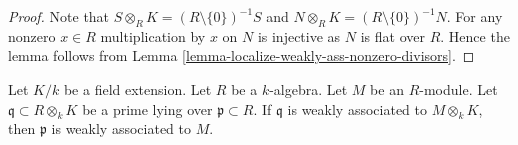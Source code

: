 \begin{proof}
Note that $S \otimes_R K = (R \setminus \{0\})^{-1}S$ and
$N \otimes_R K = (R \setminus \{0\})^{-1}N$.
For any nonzero $x \in R$ multiplication by $x$ on $N$ is injective as
$N$ is flat over $R$. Hence the lemma follows from
Lemma \ref{lemma-localize-weakly-ass-nonzero-divisors}.
\end{proof}

\begin{lemma}
\label{lemma-weakly-ass-change-fields}
Let $K/k$ be a field extension. Let $R$ be a $k$-algebra.
Let $M$ be an $R$-module. Let $\mathfrak q \subset R \otimes_k K$
be a prime lying over $\mathfrak p \subset R$. If
$\mathfrak q$ is weakly associated to $M \otimes_k K$,
then $\mathfrak p$ is weakly associated to $M$.
\end{lemma}

